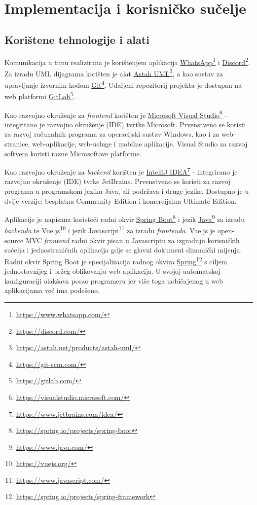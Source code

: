 \chapter{Implementacija i korisničko sučelje}
		
		
		\section{Korištene tehnologije i alati}
		
			{Komunikacija u timu realizirana je korištenjem aplikacija \underline{WhatsApp}\footnote{\url{https://www.whatsapp.com/}} i \underline{Discord}\footnote{\url{https://discord.com/}}. Za izradu UML dijagrama korišten je alat \underline{Astah UML}\footnote{\url{https://astah.net/products/astah-uml/}}, a kao sustav za upravljanje izvornim kodom \underline{Git}\footnote{\url{https://git-scm.com/}}. Udaljeni repozitorij projekta je dostupan na web platformi \underline{GitLab}\footnote{\url{https://gitlab.com/}}.
				
			Kao razvojno okruženje za \textit{frontend} korišten je \underline{Microsoft Visual Studio}\footnote{\url{https://visualstudio.microsoft.com/}} - integrirano je razvojno okruženje (IDE) tvrtke Microsoft. Prvenstveno se koristi za razvoj računalnih programa za operacijski sustav Windows, kao i za web-stranice, web-aplikacije, web-usluge i mobilne aplikacije. Visual Studio za razvoj softvera koristi razne Microsoftove platforme.
			
			Kao razvojno okruženje za \textit{backend} korišten je \underline{IntelliJ IDEA}\footnote{\url{https://www.jetbrains.com/idea/}} - integrirano je razvojno okruženje (IDE) tvrke JetBrains. Prvenstveno se koristi za razvoj programa u programskom jeziku Java, ali podržava i druge jezike. Dostupno je u dvije verzije: besplatna Community Edition i komercijalna Ultimate Edition.
			
			Aplikacije je napisana koristeći radni okvir \underline{Spring Boot}\footnote{\url{https://spring.io/projects/spring-boot}} i jezik \underline{Java}\footnote{\url{https://www.java.com/}} za izradu \textit{backenda} te \underline{Vue.js}\footnote{\url{https://vuejs.org/}} i jezik \underline{Javascript}\footnote{\url{https://www.javascript.com/}} za izradu \textit{frontenda}. Vue.js je open-source MVC \textit{frontend} radni okvir pisan u Javascriptu za izgradnju korisničkih sučelja i jednostraničnih aplikacija gdje se glavni dokument dinamički
			mijenja. Radni okvir Spring Boot je specijalizacija radnog okvira \underline{Spring}\footnote{\url{https://spring.io/projects/spring-framework}} s ciljem jednostavnijeg i bržeg oblikovanja web aplikacija. U svojoj automatskoj konfiguraciji olakšava posao programeru jer više toga uobičajenog u web aplikacijama već ima podešeno.
			
}
